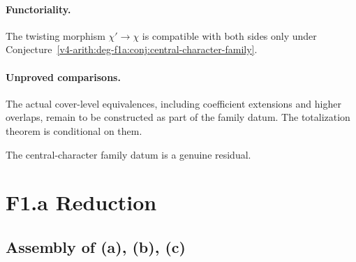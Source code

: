 \paragraph{Functoriality.} The twisting morphism
\(\chi'\to\chi\) is compatible with both sides only under
Conjecture~\ref{v4-arith:deg-f1a:conj:central-character-family}.

\paragraph{Unproved comparisons.} The actual cover-level equivalences, including coefficient
extensions and higher overlaps, remain to be constructed as part
of the family datum. The totalization theorem is conditional on them.


The central-character family datum is a genuine residual.

\section{F1.a Reduction}
\label{v4-arith:deg-f1a:reduction}

\subsection{Assembly of (a), (b), (c)}

